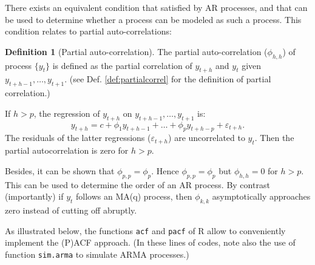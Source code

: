 \documentclass[
  12pt,
]{book}
\theoremstyle{definition}
\newtheorem{definition}{Definition}[chapter]
\theoremstyle{definition}
\theoremstyle{definition}
\theoremstyle{definition}
\theoremstyle{remark}
\begin{document}
There exists an equivalent condition that satisfied by AR processes, and that can be used to determine whether a process can be modeled as such a process. This condition relates to partial auto-correlations:

\begin{definition}[Partial auto-correlation]
\protect\hypertarget{def:partialAC}{}\label{def:partialAC}The partial auto-correlation (\(\phi_{h,h}\)) of process \(\{y_t\}\) is defined as the partial correlation of \(y_{t+h}\) and \(y_t\) given \(y_{t+h-1},\dots,y_{t+1}\). (see Def. \ref{def:partialcorrel} for the definition of partial correlation.)
\end{definition}

If \(h>p\), the regression of \(y_{t+h}\) on \(y_{t+h-1},\dots,y_{t+1}\) is:
\[
y_{t+h} = c + \phi_1 y_{t+h-1}+\dots+ \phi_p  y_{t+h-p} + \varepsilon_{t+h}.
\]
The residuals of the latter regressions (\(\varepsilon_{t+h}\)) are uncorrelated to \(y_t\). Then the partial autocorrelation is zero for \(h>p\).

Besides, it can be shown that \(\phi_{p,p}=\phi_p\). Hence \(\phi_{p,p}=\phi_p\) but \(\phi_{h,h}=0\) for \(h>p\). This can be used to determine the order of an AR process. By contrast (importantly) if \(y_t\) follows an MA(q) process, then \(\phi_{k,k}\) asymptotically approaches zero instead of cutting off abruptly.

As illustrated below, the functions \texttt{acf} and \texttt{pacf} of R allow to conveniently implement the (P)ACF approach. (In these lines of codes, note also the use of function \texttt{sim.arma} to simulate ARMA processes.)
\end{document}
